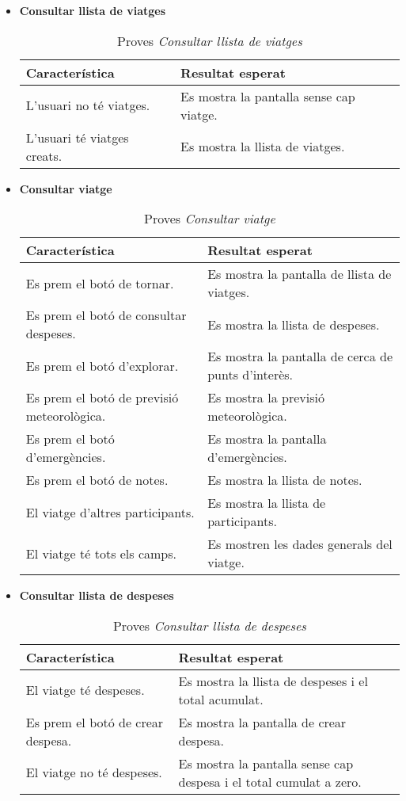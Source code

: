 \begin{itemize}
\clearpage

\item{}\textbf{Consultar llista de viatges}

\begin{table}[!h]
\centering
\begin{tabular}{|T|T|}
\hline
\textbf{Característica} & \textbf{Resultat esperat} \\\hline
L'usuari no té viatges. & Es mostra la pantalla sense cap viatge.\\\hline
L'usuari té viatges creats. & Es mostra la llista de viatges.\\\hline
\end{tabular}
\label{}
\caption{Proves \textit{Consultar llista de viatges}}
\end{table}

\item{}\textbf{Consultar viatge}

\begin{table}[!h]
\centering
\begin{tabular}{|T|T|}
\hline
\textbf{Característica} & \textbf{Resultat esperat} \\\hline
Es prem el botó de tornar. & Es mostra la pantalla de llista de viatges.\\\hline
Es prem el botó de consultar despeses. & Es mostra la llista de despeses.\\\hline
Es prem el botó d'explorar. & Es mostra la pantalla de cerca de punts d'interès.\\\hline
Es prem el botó de previsió meteorològica. & Es mostra la previsió meteorològica.\\\hline
Es prem el botó d'emergències. & Es mostra la pantalla d'emergències.\\\hline
Es prem el botó de notes. & Es mostra la llista de notes.\\\hline
El viatge d'altres participants. & Es mostra la llista de participants.\\\hline
El viatge té tots els camps. & Es mostren les dades generals del viatge.\\\hline
\end{tabular}
\label{}
\caption{Proves \textit{Consultar viatge}}
\end{table}

\item{}\textbf{Consultar llista de despeses}

\begin{table}[!h]
\centering
\begin{tabular}{|T|T|}
\hline
\textbf{Característica} & \textbf{Resultat esperat} \\\hline
El viatge té despeses. & Es mostra la llista de despeses i el total acumulat.\\\hline
Es prem el botó de crear despesa. & Es mostra la pantalla de crear despesa.\\\hline
El viatge no té despeses. & Es mostra la pantalla sense cap despesa i el total cumulat a zero.\\\hline
\end{tabular}
\label{}
\caption{Proves \textit{Consultar llista de despeses}}
\end{table}


\end{itemize}
